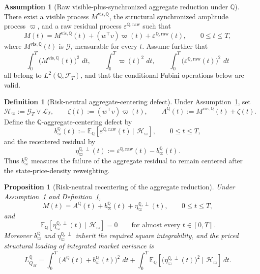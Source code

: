 \documentclass[11pt,a4paper]{amsart}
\theoremstyle{plain}
\newtheorem{proposition}[theorem]{Proposition}
\theoremstyle{definition}
\newtheorem{definition}[theorem]{Definition}
\newtheorem{assumption}[theorem]{Assumption}
\theoremstyle{remark}
\newcommand{\QQ}{\mathbb{Q}}
\newcommand{\EE}{\mathbb{E}}
\newcommand{\cF}{\mathcal{F}}
\newcommand{\cG}{\mathcal{G}}
\newcommand{\cH}{\mathcal{H}}
\newcommand{\cL}{\mathcal{L}}
\newcommand{\dd}{\,d}
\begin{document}
\begin{assumption}[Raw visible-plus-synchronized aggregate reduction under \(\QQ\)]\label{ass:q-raw-visible-aggregate}
There exist a visible process \(M^{\mathrm{vis},\QQ}\), the structural synchronized amplitude
process \(\varpi\), and a raw residual process \(\varepsilon^{\QQ,\mathrm{raw}}\) such that
\[
        M(t)=M^{\mathrm{vis},\QQ}(t)+(w^\top v)\varpi(t)+\varepsilon^{\QQ,\mathrm{raw}}(t),
        \qquad
        0\le t\le T,
\]
where \(M^{\mathrm{vis},\QQ}(t)\) is \(\cG_t\)-measurable for every \(t\).  Assume further that
\[
        \int_0^T \bigl(M^{\mathrm{vis},\QQ}(t)\bigr)^2\,\dd t,
        \qquad
        \int_0^T \varpi(t)^2\,\dd t,
        \qquad
        \int_0^T \bigl(\varepsilon^{\QQ,\mathrm{raw}}(t)\bigr)^2\,\dd t
\]
all belong to \(L^2(\QQ,\cF_T)\), and that the conditional Fubini operations below are valid.
\end{assumption}

\begin{definition}[Risk-neutral aggregate-centering defect]\label{def:q-centering-defect}
Under Assumption~\ref{ass:q-raw-visible-aggregate}, set
\[
        \cH_\varpi:=\cG_T\vee\cL_T,
        \qquad
        \zeta(t):=(w^\top v)\varpi(t),
        \qquad
        A^\QQ(t):=M^{\mathrm{vis},\QQ}(t)+\zeta(t).
\]
Define the \(\QQ\)-aggregate-centering defect by
\[
        b_\varpi^\QQ(t)
        :=
        \EE_\QQ[\varepsilon^{\QQ,\mathrm{raw}}(t)\mid \cH_\varpi],
        \qquad
        0\le t\le T,
\]
and the recentered residual by
\[
        \eta_\varpi^{\QQ,\perp}(t)
        :=
        \varepsilon^{\QQ,\mathrm{raw}}(t)-b_\varpi^\QQ(t).
\]
Thus \(b_\varpi^\QQ\) measures the failure of the aggregate residual to remain centered after
the state-price-density reweighting.
\end{definition}

\begin{proposition}[Risk-neutral recentering of the aggregate reduction]\label{prop:q-recentering}
Under Assumption~\ref{ass:q-raw-visible-aggregate} and
Definition~\ref{def:q-centering-defect},
\[
        M(t)=A^\QQ(t)+b_\varpi^\QQ(t)+\eta_\varpi^{\QQ,\perp}(t),
        \qquad
        0\le t\le T,
\]
and
\[
        \EE_\QQ[\eta_\varpi^{\QQ,\perp}(t)\mid\cH_\varpi]=0
        \qquad
        \text{for almost every }t\in[0,T].
\]
Moreover \(b_\varpi^\QQ\) and \(\eta_\varpi^{\QQ,\perp}\) inherit the required square
integrability, and the priced structural loading of integrated market variance is
\[
        L_{Q_M}^\QQ
        =
        \int_0^T \bigl(A^\QQ(t)+b_\varpi^\QQ(t)\bigr)^2\,\dd t
        +
        \int_0^T
        \EE_\QQ\!\left[
                \bigl(\eta_\varpi^{\QQ,\perp}(t)\bigr)^2
                \mid \cH_\varpi
        \right]\dd t.
\]
\end{proposition}
\end{document}
